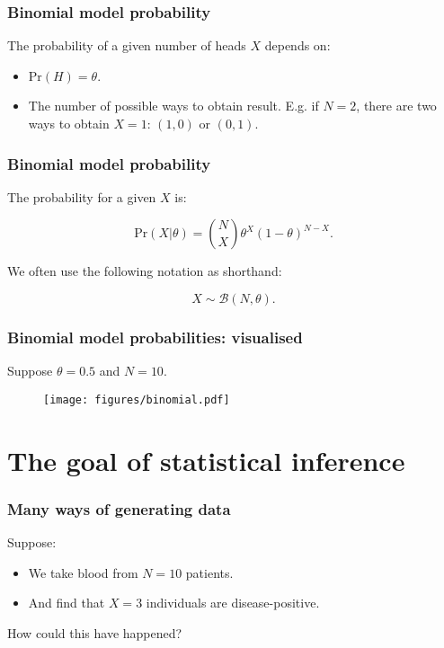 \documentclass{beamer}
\begin{document}
\begin{frame}
	\frametitle{Binomial model probability}
	The probability of a given number of heads $X$ depends on:
	
	\begin{itemize}
		\item $\text{Pr}(H) = \theta$.
		\item The number of possible ways to obtain result. E.g. if $N=2$, there are two ways to obtain $X=1$: $(1,0)$ or $(0,1)$.
		\end{itemize}
\end{frame}

\begin{frame}
	\frametitle{Binomial model probability}
	The probability for a given $X$ is:
	
	\begin{equation}
	\text{Pr}(X|\theta) = \binom{N}{X} \theta^X (1- \theta)^{N-X}.
	\end{equation}
	
	We often use the following notation as shorthand:
	
	\begin{equation}
	X\sim \mathcal{B}(N, \theta).
	\end{equation}
	
\end{frame}

\begin{frame}
	\frametitle{Binomial model probabilities: visualised}
	
	Suppose $\theta=0.5$ and $N=10$.
	
	\begin{figure}[h]
		\centerline{\texttt{[image: figures/binomial.pdf]}}
	\end{figure}
	
\end{frame}

\section{The goal of statistical inference}
\frame{\tableofcontents[currentsection]}


\begin{frame}
	\frametitle{Many ways of generating data}
	
	Suppose:
	
	\begin{itemize}
		\item We take blood from $N=10$ patients.
		\item And find that $X=3$ individuals are disease-positive.
	\end{itemize}
	
	How could this have happened?
	
\end{frame}
\end{document}
